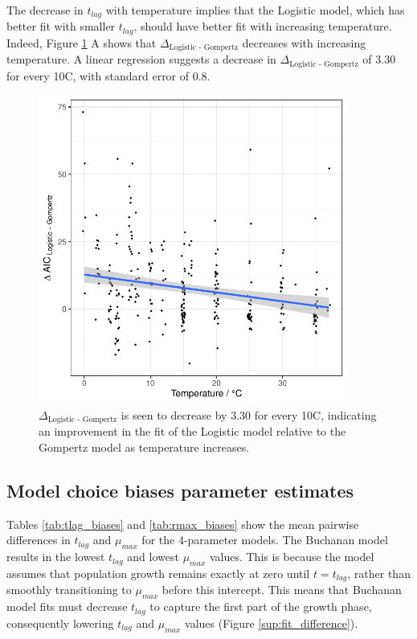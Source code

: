 \documentclass[11pt, a4paper]{article}
\begin{document}
\begin{linenumbers}
The decrease in $t_{lag}$ with temperature implies that the Logistic model, which has better fit with smaller $t_{lag}$, should have better fit with increasing temperature. Indeed, Figure \ref{fig:logistic_temp} A shows that $\Delta_{\text{Logistic - Gompertz}}$  decreases with increasing temperature. A linear regression suggests a decrease in $\Delta_{\text{Logistic - Gompertz}}$ of 3.30 for every 10\degree C, with standard error of 0.8.

                \begin{figure}[H]
                \centering
        \includegraphics[width=4in]{../results/logistic_vs_gompertz_temp.pdf}
        \caption{$\Delta_{\text{Logistic - Gompertz}}$ is seen to decrease by 3.30 for every 10\degree C, indicating an improvement in the fit of the Logistic model relative to the Gompertz model as temperature increases.}
        \label{fig:logistic_temp}
        \end{figure}  

\subsection{Model choice biases parameter estimates}

Tables \ref{tab:tlag_biases} and \ref{tab:rmax_biases} show the mean pairwise differences in $t_{lag}$ and $\mu_{max}$ for the 4-parameter models. The Buchanan model results in the lowest $t_{lag}$ and lowest $\mu_{max}$ values. This is because the model assumes that population growth remains exactly at zero until $t = t_{lag}$, rather than smoothly transitioning to $\mu_{max}$ before this intercept. This means that Buchanan model fits must decrease $t_{lag}$ to capture the first part of the growth phase, consequently lowering $t_{lag}$ and $\mu_{max}$ values (Figure \ref{sup:fit_difference}).


\end{linenumbers}
\end{document}
